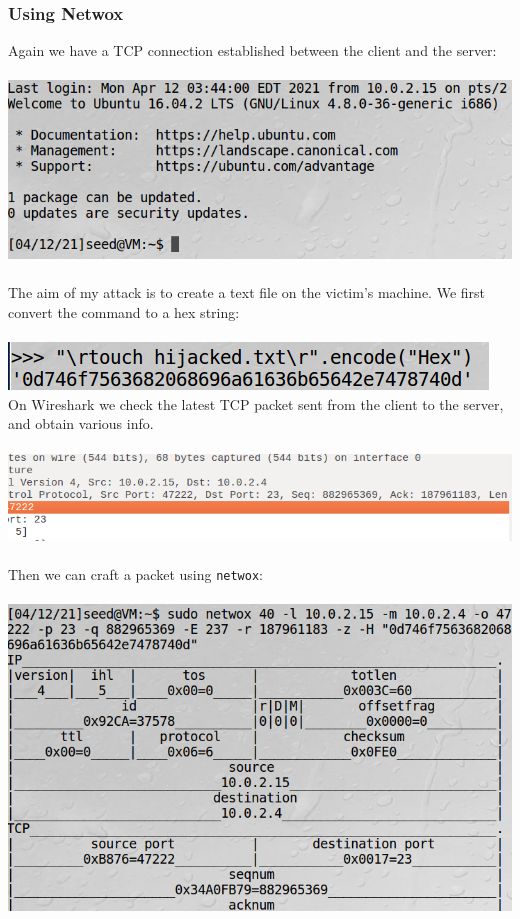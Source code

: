 \documentclass[a4paper]{article}
\begin{document}
\subsubsection{Using Netwox}
Again we have a TCP connection established between the client and the server:\\\\
\includegraphics[scale=0.7]{1/22.png}\\\\
The aim of my attack is to create a text file on the victim's machine. We first convert the command to a hex string:\\\\
\pagebreak
\includegraphics[scale=0.7]{1/23.png}
\\On Wireshark we check the latest TCP packet sent from the client to the server, and obtain various info.\\\\
\includegraphics[scale=0.7]{1/24.png}\\\\
Then we can craft a packet using \verb+netwox+:\\\\
\includegraphics[scale=0.7]{1/25.png}\\\\
\end{document}
